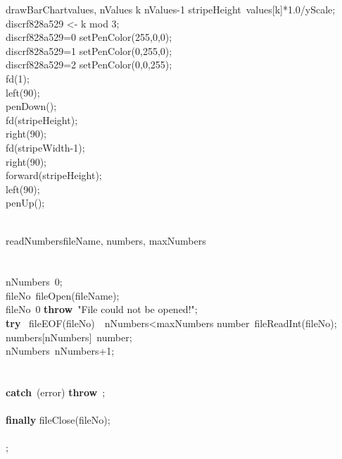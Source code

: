 \documentclass[a4paper,10pt]{article}
\begin{document}
\begin{pseudocode}{drawBarChart}{values, nValues }
  \FOR k  \TO nValues-1  \DO
  \BEGIN
    stripeHeight\gets\ values[k]*1.0/yScale;\\
    discrf828a529 <- k mod 3;\\
    \IF discrf828a529=0 \THEN
      setPenColor(255,0,0);\\
    \ELSEIF discrf828a529=1 \THEN
      setPenColor(0,255,0);\\
    \ELSEIF discrf828a529=2 \THEN
      setPenColor(0,0,255);\\
    fd(1);\\
    left(90);\\
    penDown();\\
    fd(stripeHeight);\\
    right(90);\\
    fd(stripeWidth-1);\\
    right(90);\\
    forward(stripeHeight);\\
    left(90);\\
    penUp();\\
  \END\\
\ENDPROCEDURE
\end{pseudocode}


\begin{pseudocode}{readNumbers}{fileName, numbers, maxNumbers }
\label{readNumbers}
\\
\\
\\
  nNumbers\gets\ 0;\\
  fileNo\gets\ fileOpen(fileName);\\
  \IF fileNo\leq\ 0 \THEN
    \textbf{throw}\ "File could not be opened!";\\
  \textbf{try} \BEGIN
    \WHILE \NOT\ fileEOF(fileNo)\ \AND\ nNumbers<maxNumbers \DO
    \BEGIN
      number\gets\ fileReadInt(fileNo);\\
      numbers[nNumbers]\gets\ number;\\
      nNumbers\gets\ nNumbers+1;\\
    \END\\
  \END\\
  \textbf{catch}\ (error)\BEGIN
    \textbf{throw}\ ;\\
  \END\\
  \textbf{finally} \BEGIN
    fileClose(fileNo);\\
  \END\\
  ;\\
\ENDPROCEDURE
\end{pseudocode}
\end{document}
